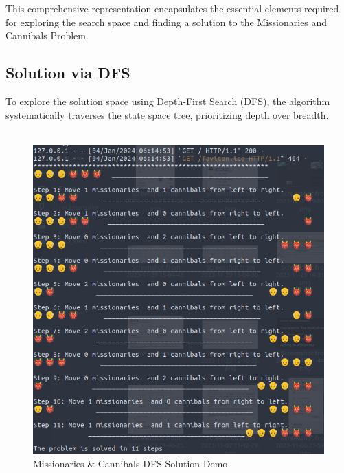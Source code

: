 \documentclass[12pt]{article}
\begin{document}
This comprehensive representation encapsulates the essential elements required for exploring the search space and finding a solution to the Missionaries and Cannibals Problem.

\clearpage
\subsection{Solution via DFS}
To explore the solution space using Depth-First Search (DFS), the algorithm systematically traverses the state space tree, prioritizing depth over breadth.
\\\\
\begin{figure}[h]
  \centerline{\includegraphics[width = 150mm]{MnC_DFS_demo.png}}
  \caption{Missionaries & Cannibals DFS Solution Demo}
  \label{fig}
\end{figure}
\clearpage
\end{document}
